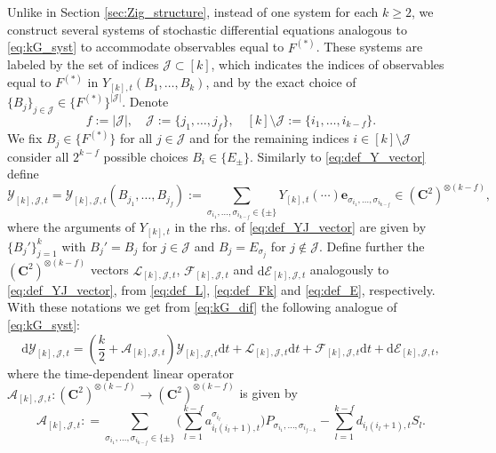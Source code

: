 \documentclass[10pt]{amsart}
\numberwithin{equation}{section}
\newcommand{\dif}{\mathrm{d}}
\newcommand{\C}{\mathbf{C}}
\begin{document}
Unlike in Section \ref{sec:Zig_structure}, instead of one system for each $k\ge 2$, we construct several systems of stochastic differential equations analogous to \eqref{eq:kG_syst} to accommodate observables equal to $F^{(*)}$. These systems are labeled  by the set of indices $\mathcal{J}\subset [k]$, which indicates the indices of observables equal to $F^{(*)}$ in $Y_{[k],t}(B_1,\ldots,B_k)$, and by the exact choice of $\{B_j\}_{j\in \mathcal{J}} \in \{F^{(*)}\}^{|\mathcal{J}|}$. Denote
\begin{equation*}
f:=|\mathcal{J}|,\quad \mathcal{J}:=\{j_1,\ldots,j_f\},\quad [k]\setminus\mathcal{J}:=\{i_1,\ldots,i_{k-f}\}.
\end{equation*}
We fix $B_{j}\in \{F^{(*)}\}$ for all $j\in \mathcal{J}$ and for the remaining indices $i\in [k]\setminus\mathcal{J}$ consider all $2^{k-f}$ possible choices $B_i\in\{E_\pm\}$. Similarly to \eqref{eq:def_Y_vector} define
\begin{equation}
\mathcal{Y}_{[k],\mathcal{J},t}=\mathcal{Y}_{[k],\mathcal{J},t}(B_{j_1},\ldots,B_{j_f}):=\sum_{\sigma_{i_1},\ldots,\sigma_{i_{k-f}}\in\{\pm\}} Y_{[k],t}(\cdots) \bm{e}_{\sigma_{i_1},\ldots,\sigma_{i_{k-f}}}\in (\C^2)^{\otimes (k-f)},
\label{eq:def_YJ_vector}
\end{equation}
where the arguments of $Y_{[k],t}$ in the rhs. of \eqref{eq:def_YJ_vector} are given by $\{B_j'\}_{j=1}^k$ with $B_j'=B_j$ for $j\in \mathcal{J}$ and $B_j=E_{\sigma_j}$ for $j\notin \mathcal{J}$. Define further the $(\C^2)^{\otimes (k-f)}$ vectors $\mathcal{L}_{[k],\mathcal{J},t}$, $\mathcal{F}_{[k],\mathcal{J},t}$ and $\dif\mathcal{E}_{[k],\mathcal{J},t}$ analogously to \eqref{eq:def_YJ_vector}, from \eqref{eq:def_L}, \eqref{eq:def_Fk} and \eqref{eq:def_E}, respectively. With these notations we get from \eqref{eq:kG_dif} the following analogue of \eqref{eq:kG_syst}:
\begin{equation}
\dif \mathcal{Y}_{[k],\mathcal{J},t} = \left(\frac{k}{2} + \mathcal{A}_{[k],\mathcal{J},t}\right)\mathcal{Y}_{[k],\mathcal{J},t} \dif t + \mathcal{L}_{[k],\mathcal{J},t}\dif t + \mathcal{F}_{[k],\mathcal{J},t} \dif t + \dif\mathcal{E}_{[k],\mathcal{J},t},
\label{eq:kJ_syst}
\end{equation}
where the time-dependent linear operator $\mathcal{A}_{[k],\mathcal{J},t}:(\C^2)^{\otimes (k-f)}\to (\C^2)^{\otimes (k-f)}$ is given by
\begin{equation}
\mathcal{A}_{[k],\mathcal{J},t}: = \sum_{\sigma_{i_1},\ldots,\sigma_{i_{k-f}}\in\{\pm\}} \bigg(\sum_{l=1}^{k-f} a_{{i_l}(i_{l}+1),t}^{\sigma_{i_l}}\bigg)P_{\sigma_{i_1},\ldots,\sigma_{i_{f-k}}} - \sum_{l=1}^{k-f} d_{i_l(i_l+1),t}S_{l}.
\label{eq:def_general_AJ}
\end{equation}
\end{document}
